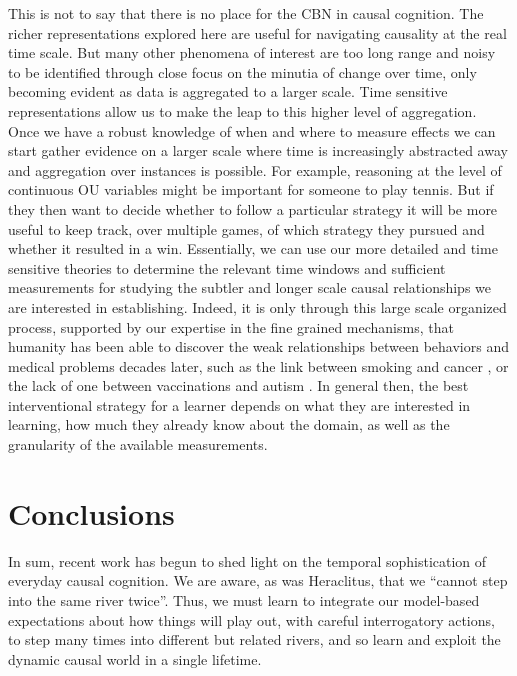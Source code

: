 \documentclass{cambridge7A}%
\newcommand{\ntodo}[2][]{\vspace{0.1cm} \hfil \todo[caption={\textbf{NB}}, size=\footnotesize, color = aliceblue, inline, #1]{#2}}
\begin{document}
This is not to say that there is no place for the CBN in causal cognition.  %
The richer representations explored here are useful for navigating causality at the real time scale.  But many other phenomena of interest are too long range and noisy to be identified through close focus on the minutia of change over time, only becoming evident as data is aggregated to a larger scale.  Time sensitive representations allow us to make the leap to this higher level of aggregation.  Once we have a robust knowledge of when and where to measure effects we can start gather evidence on a larger scale where time is increasingly abstracted away and aggregation over instances is possible.  For example, reasoning at the level of continuous OU variables might be important for someone to play tennis. But if they then want to decide whether to follow a particular strategy it will be more useful to keep track, over multiple games, of which strategy they pursued and whether it resulted in a win.  Essentially, we can use our more detailed and time sensitive theories to determine the relevant time windows and sufficient measurements for studying the subtler and longer scale causal relationships we are interested in establishing.  Indeed, it is only through this large scale organized process, supported by our expertise in the fine grained mechanisms, that humanity has been able to discover the weak relationships between behaviors and medical problems decades later, such as the link between smoking and cancer \citep{gandini2008tobacco}, or the lack of one between vaccinations and autism \citep{verschuur1996hidden}.  In general then, the best interventional strategy for a learner depends on what they are interested in learning, how much they already know about the domain, as well as the granularity of the available measurements.


\section{Conclusions}

In sum, recent work has begun to shed light on the temporal sophistication of everyday causal cognition.  We are aware, as was Heraclitus, that we ``cannot step into the same river twice''\citep{barnes2013presocratics}.  Thus, we must learn to integrate our model-based expectations about how things will play out, with careful interrogatory actions, to step many times into different but related rivers, and so learn and exploit the dynamic causal world in a single lifetime.

\clearpage


\end{document}
